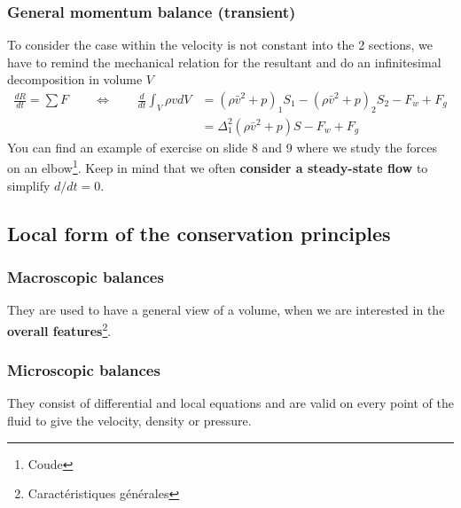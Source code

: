 		\subsubsection{General momentum balance (transient)}
			To consider the case within the velocity is not constant into the 2 sections, we have to remind the mechanical relation for the resultant and do an infinitesimal decomposition in volume $V$	
			\begin{equation}						
			\begin{aligned}
				\frac{dR}{dt} = \sum F \qquad \Leftrightarrow \qquad \frac{d}{dt}\int _V \rho v dV &= (\rho \bar{v}^2 +p)_1S_1 - (\rho \bar{v}^2 +p)_2S_2 - F_w + F_g \\
				&= \Delta ^2 _1 (\rho \bar{v}^2  +p)S-F_w+F_g
			\end{aligned}
			\end{equation}
			You can find an example of exercise on slide 8 and 9 where we study the forces on an elbow\footnote{Coude}. Keep in mind that we often \textbf{consider a steady-state flow} to simplify $d/dt = 0$.
			
		\subsection{Local form of the conservation principles}
			\subsubsection{Macroscopic balances}
				They are used to have a general view of a volume, when we are interested in the \textbf{overall features}\footnote{Caractéristiques générales}.
			\subsubsection{Microscopic balances}
				They consist of differential and local equations and are valid on every point of the fluid to give the velocity, density or pressure. 

